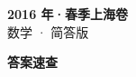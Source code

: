 \documentclass[zihao=-4, a4paper]{ctexart}
\begin{document}
\begin{center}
  {\Large\bfseries 2016 年·春季上海卷}\\[4pt]
  {\large 数学 · 简答版}
\end{center}
\medskip
{}

\clearpage
{}
\begin{center}{\Large\bfseries 答案速查}\end{center}
\medskip

\end{document}
